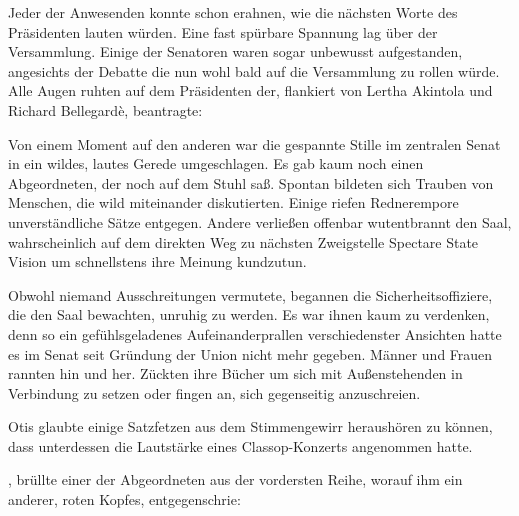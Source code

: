 \par

Jeder der Anwesenden konnte schon erahnen, wie die nächsten Worte des Präsidenten lauten würden.
Eine fast spürbare Spannung lag über der Versammlung.
Einige der Senatoren waren sogar unbewusst aufgestanden, angesichts der Debatte die nun wohl bald auf die Versammlung zu rollen würde.
Alle Augen ruhten auf dem Präsidenten der, flankiert von Lertha Akintola und Richard Bellegardè, beantragte:

\par

Von einem Moment auf den anderen war die gespannte Stille im zentralen Senat in ein wildes, lautes Gerede umgeschlagen.
Es gab kaum noch einen Abgeordneten, der noch auf dem Stuhl saß. Spontan bildeten sich Trauben von Menschen, die wild miteinander diskutierten.
Einige riefen Rednerempore unverständliche Sätze entgegen.
Andere verließen offenbar wutentbrannt den Saal, wahrscheinlich auf dem direkten Weg zu nächsten Zweigstelle Spectare State Vision um schnellstens ihre Meinung kundzutun.

\par

Obwohl niemand Ausschreitungen vermutete, begannen die Sicherheitsoffiziere, die den Saal bewachten, unruhig zu werden.
Es war ihnen kaum zu verdenken, denn so ein gefühlsgeladenes Aufeinanderprallen verschiedenster Ansichten hatte es im Senat seit Gründung der Union nicht mehr gegeben.
Männer und Frauen rannten hin und her.
Zückten ihre Bücher um sich mit Außenstehenden in Verbindung zu setzen oder fingen an, sich gegenseitig anzuschreien.

\par

Otis glaubte einige Satzfetzen aus dem Stimmengewirr heraushören zu können, dass unterdessen die Lautstärke eines Classop-Konzerts angenommen hatte.

\par

, brüllte einer der Abgeordneten aus der vordersten Reihe, worauf ihm ein anderer, roten Kopfes, entgegenschrie:

\par

